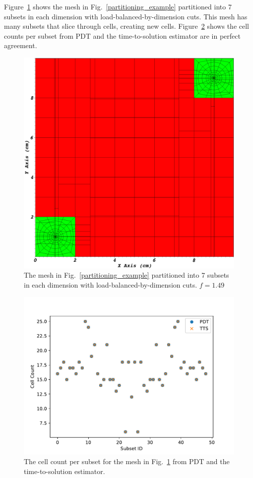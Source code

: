 Figure~\ref{ubp_7x7} shows the mesh in Fig.~\ref{partitioning_example} partitioned into 7 subsets in each dimension with load-balanced-by-dimension cuts. This mesh has many subsets that slice through cells, creating new cells. Figure~\ref{cell_comp} shows the cell counts per subset from PDT and the time-to-solution estimator are in perfect agreement.
\begin{figure}[H]
\centering
\includegraphics[scale=0.15]{../figures/spiderweb_7x7_lbd.png}
\caption{The mesh in Fig.~\ref{partitioning_example} partitioned into 7 subsets in each dimension with load-balanced-by-dimension cuts. $f = 1.49$}
\label{ubp_7x7}
\end{figure}
\begin{figure}[H]
\centering
\includegraphics[scale=0.75]{../figures/spiderweb_cell_comp_7x7.pdf}
\caption{The cell count per subset for the mesh in Fig.~\ref{ubp_7x7} from PDT and the time-to-solution estimator.}
\label{cell_comp}
\end{figure}

